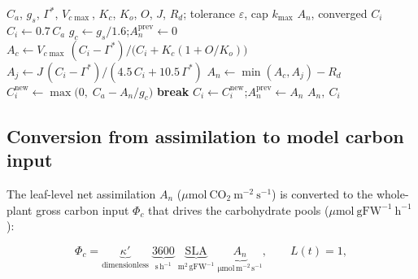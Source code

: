 \documentclass[a4paper,fleqn]{cas-sc}
\begin{document}
\begin{algorithm}[!htbp]
\caption{Farquhar-Jarvis gas-exchange coupling: fixed-point solution of the intercellular CO$_2$ concentration.}
\label{alg:ci_fixedpoint}
\begin{algorithmic}[1]
\REQUIRE $C_a$, $g_s$, $\Gamma^{*}$, $V_{c\max}$, $K_c$, $K_o$, $O$, $J$, $R_d$; tolerance $\varepsilon$, cap $k_{\max}$
\ENSURE $A_n$, converged $C_i$
\STATE $C_i \leftarrow 0.7\,C_a$
\STATE $g_c \leftarrow g_s/1.6$;\quad $A_n^{\text{prev}} \leftarrow 0$
  \STATE $A_c \leftarrow V_{c\max}\,(C_i-\Gamma^{*}) / \bigl(C_i + K_c(1+O/K_o)\bigr)$
  \STATE $A_j \leftarrow J\,(C_i-\Gamma^{*}) / (4.5\,C_i + 10.5\,\Gamma^{*})$
  \STATE $A_n \leftarrow \min(A_c,A_j) - R_d$
  \STATE $C_i^{\text{new}} \leftarrow \max\!\bigl(0,\; C_a - A_n/g_c\bigr)$
    \STATE \textbf{break}
  \ENDIF
  \STATE $C_i \leftarrow C_i^{\text{new}}$;\quad $A_n^{\text{prev}} \leftarrow A_n$
\ENDFOR
\RETURN $A_n,\ C_i$
\end{algorithmic}
\end{algorithm}

\subsection{Conversion from assimilation to model carbon input}
\label{sec:conversion}

The leaf-level net assimilation $A_n$
($\mu\mathrm{mol\ CO_2\ m^{-2}\ s^{-1}}$) is converted to the
whole-plant gross carbon input $\Phi_c$ that drives the carbohydrate pools
($\mu\mathrm{mol\ gFW^{-1}\ h^{-1}}$):

\begin{equation}
\Phi_c =
\underbrace{\kappa'}_{\text{dimensionless}}\;
\underbrace{3600}_{\mathrm{s\,h^{-1}}}\;
\underbrace{\mathrm{SLA}}_{\mathrm{m^{2}\,gFW^{-1}}}\;
\underbrace{A_n}_{\mathrm{\mu mol\,m^{-2}\,s^{-1}}},
\qquad L(t)=1,
\label{eq:conversion}
\end{equation}
\end{document}
